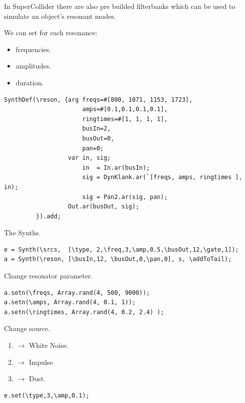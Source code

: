 In SuperCollider there are also pre builded filterbanks which can be used to simulate an object's resonant modes.

We can set for each resonance:
\begin{itemize}
\tightlist
\item frequencies.
\item amplitudes.
\item duration.
\end{itemize}

\begin{lstlisting}[frame=single, caption=Resonators model] 
SynthDef(\reson, {arg freqs=#[800, 1071, 1153, 1723],
                      amps=#[0.1,0.1,0.1,0.1],
                      ringtimes=#[1, 1, 1, 1],
                      busIn=2,
                      busOut=0,
                      pan=0;
                  var in, sig;
                      in  = In.ar(busIn);
                      sig = DynKlank.ar(`[freqs, amps, ringtimes ], in);
                      sig = Pan2.ar(sig, pan); 
                  Out.ar(busOut, sig);
         }).add;
\end{lstlisting}

The Synths.

\begin{lstlisting}[frame=single] 
e = Synth(\srcs,  [\type, 2,\freq,3,\amp,0.5,\busOut,12,\gate,1]);
a = Synth(\reson, [\busIn,12, \busOut,0,\pan,0], s, \addToTail);
\end{lstlisting}

Change resonator parameter.

\begin{lstlisting}[frame=single] 
a.setn(\freqs, Array.rand(4, 500, 9000));
a.setn(\amps, Array.rand(4, 0.1, 1));
a.setn(\ringtimes, Array.rand(4, 0.2, 2.4) );
\end{lstlisting}

Change source. 

\begin{enumerate}
\def\labelenumi{\arabic{enumi}.}
\tightlist
\item \(\rightarrow\) White Noise. 
\item \(\rightarrow\) Impulse
\item \(\rightarrow\) Dust.
\end{enumerate}

\begin{lstlisting}[frame=single] 
e.set(\type,3,\amp,0.1);
\end{lstlisting}

